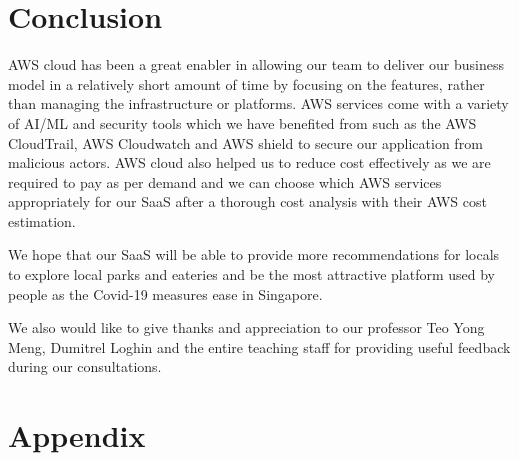 \documentclass[12pt,a4paper]{article}
\begin{document}
\section{Conclusion}

AWS cloud has been a great enabler in allowing our team to deliver our business model in a relatively short amount of time by focusing on the features, rather than managing the infrastructure or platforms. AWS services come with a variety of AI/ML and security tools which we have benefited from such as the AWS CloudTrail, AWS Cloudwatch and AWS shield to secure our application from malicious actors. AWS cloud also helped us to reduce cost effectively as we are required to pay as per demand and we can choose which AWS services appropriately for our SaaS after a thorough cost analysis with their AWS cost estimation. 

We hope that our SaaS will be able to provide more recommendations for locals to explore local parks and eateries and be the most attractive platform used by people as the Covid-19 measures ease in Singapore. 

We also would like to give thanks and appreciation to our professor Teo Yong Meng, Dumitrel Loghin and the entire teaching staff for providing useful feedback during our consultations.

\newpage
{}
\section*{Appendix}
\end{document}
